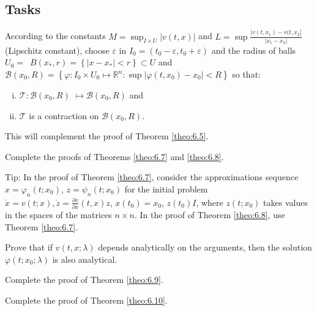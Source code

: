 \subsection*{Tasks}
\begin{task}
	According to the constants $M=\sup_{I\times
		U}\left\vert v(t,x)\right\vert $ and $L=
	\sup \frac{\left\vert
		v(t,x_{1})-v(t,x_{2}\right\vert}{\left\vert x_{1}-x_{2}\right\vert} $ (Lipschitz constant), choose $\varepsilon $ in $I_{0}=(t_{0}-\varepsilon
	,t_{0}+\varepsilon )$ and the radius of balls $U_{0}=$\
	$B(x_{\ast },r)=\left\{
	\left\vert x-x_{\ast }\right\vert <r\right\} \subset U$ and $\mathcal{B} (x_{0},R)=\left\{ \varphi :I_{0}\times U_{0}\longmapsto \mathbb{R}^{n}:\sup
	\left\vert \varphi (t,x_{0})-x_{0}\right\vert <R\right\} $ so that:
	\begin{enumerate}[(i)]
		\item $\mathcal{T}:\mathcal{B}(x_{0},R)$ $\longmapsto \mathcal{B}(x_{0},R)$ and
		\item $\mathcal{T}$ is a contraction on $\mathcal{B}(x_{0},R)$.
	\end{enumerate}
	This will complement the proof of Theorem \ref{theo:6.5}.
\end{task}

\begin{task}
	Complete the proofs of Theorems \ref{theo:6.7} and \ref{theo:6.8}.
	
	Tip: In the proof of Theorem \ref{theo:6.7}, consider the approximations sequence $x=\varphi _{n}(t;x_{0})$, $z=\psi _{n}(t;x_{0})$ for the initial problem $\dot{x}=v(t;x),\dot{z}=\frac{\partial v}{\partial x}(t,x)z$, $x(t_{0})=x_{0}$, $z(t_{0})I$, where $z(t;x_{0})$ takes values in the spaces of the matrices $n \times n$. In the proof of Theorem \ref{theo:6.8}, use Theorem \ref{theo:6.7}.
\end{task}

\begin{task}
	Prove that if $v (t, x; \lambda)$ depends analytically on the arguments, then the solution $\varphi (t;x_{0};\lambda )$ is also analytical.
\end{task}

\begin{task}
	Complete the proof of Theorem \ref{theo:6.9}.
\end{task}

\begin{task}
	Complete the proof of Theorem \ref{theo:6.10}.
\end{task}


